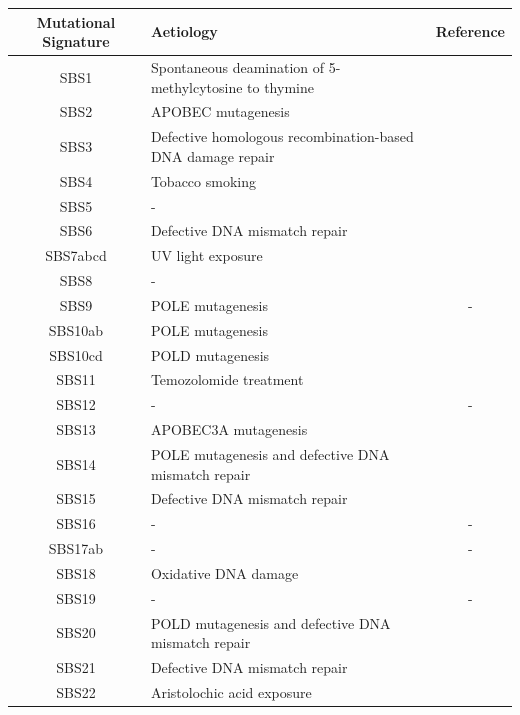 \begingroup
\setlength{\LTleft}{-10cm plus -1fill} %
\setlength{\LTright}{\LTleft}
\begin{longtable}{c|p{10cm}|c}
\label{tab:pcawg-mutational-signatures} \\ \smallskip
Mutational Signature & Aetiology & Reference \\ \hline

SBS1 & Spontaneous deamination of 5-methylcytosine to thymine & \cite{Alexandrov2015-db} \\ \hline
SBS2 & APOBEC mutagenesis & \cite{Burns2013-xn} \\ \hline
SBS3 & Defective homologous recombination-based DNA damage repair & \cite{Zamborszky2017-ma} \\ \hline
SBS4 & Tobacco smoking & \cite{Alexandrov2016-uw} \\ \hline
SBS5 & - & \cite{Alexandrov2015-db} \\ \hline
SBS6 & Defective DNA mismatch repair & \cite{Meier2018-cj} \\ \hline
SBS7abcd & UV light exposure & \cite{Nik-Zainal2015-bj} \\ \hline
SBS8 & - & \\ \hline
SBS9 & POLE mutagenesis & - \\ \hline
SBS10ab & POLE mutagenesis & \cite{Robinson2021-te} \\ \hline
SBS10cd & POLD mutagenesis & \cite{Robinson2021-te} \\ \hline
SBS11 & Temozolomide treatment & \cite{Kucab2019-fy} \\ \hline
SBS12 & - & - \\ \hline
SBS13 & APOBEC3A mutagenesis & \cite{Chan2015-sk} \\ \hline
SBS14 & POLE mutagenesis and defective DNA mismatch repair & \cite{Hodel2020-je} \\ \hline
SBS15 & Defective DNA mismatch repair & \cite{Meier2018-cj} \\ \hline
SBS16 & - & - \\ \hline
SBS17ab & - & - \\ \hline
SBS18 & Oxidative DNA damage & \cite{Kucab2019-fy} \\ \hline
SBS19 & - & - \\ \hline
SBS20 & POLD mutagenesis and defective DNA mismatch repair  & \cite{Meier2018-cj} \\ \hline
SBS21 & Defective DNA mismatch repair & \cite{Meier2018-cj} \\ \hline
SBS22 & Aristolochic acid exposure & \cite{Nik-Zainal2015-bj} \\ \hline

\end{longtable}
